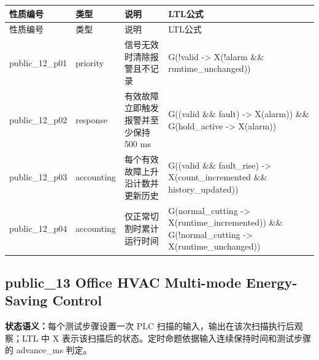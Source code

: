 \begin{longtable}{L{2.3cm}L{1.7cm}L{4.1cm}L{5.2cm}}

\toprule

性质编号 & 类型 & 说明 & LTL公式\\

\midrule

\endfirsthead

\toprule

性质编号 & 类型 & 说明 & LTL公式\\

\midrule

\endhead

{\ttfamily public\_12\_p01} & priority & 信号无效时清除报警且不记录 & {\ttfamily G(!valid -> X(!alarm \&\& runtime\_unchanged))}\\

{\ttfamily public\_12\_p02} & response & 有效故障立即触发报警并至少保持 500 ms & {\ttfamily G((valid \&\& fault) -> X(alarm)) \&\& G(hold\_active -> X(alarm))}\\

{\ttfamily public\_12\_p03} & accounting & 每个有效故障上升沿计数并更新历史 & {\ttfamily G((valid \&\& fault\_rise) -> X(count\_incremented \&\& history\_updated))}\\

{\ttfamily public\_12\_p04} & accounting & 仅正常切割时累计运行时间 & {\ttfamily G(normal\_cutting -> X(runtime\_incremented)) \&\& G(!normal\_cutting -> X(runtime\_unchanged))}\\

\bottomrule

\end{longtable}

\subsection{{\ttfamily public\_13} Office HVAC Multi-mode Energy-Saving Control}

\noindent\textbf{状态语义：}每个测试步骤设置一次 PLC 扫描的输入，输出在该次扫描执行后观察；LTL 中 X 表示该扫描后的状态。定时命题依据输入连续保持时间和测试步骤的 advance\_ms 判定。

